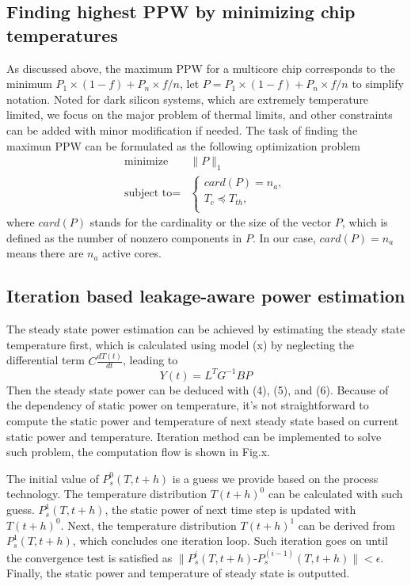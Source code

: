 \subsection{Finding highest PPW by minimizing chip temperatures}
As discussed above, the maximum PPW for a multicore chip corresponds to the minimum $P_{1} \times (1-f)+P_{n} \times f/n$, let $P = P_{1} \times (1-f)+P_{n} \times f/n$ to simplify notation. Noted for dark silicon systems, which are extremely temperature limited, we focus on the major problem of thermal limits, and other constraints can be added with minor modification if needed. The task of finding the maximun PPW can be formulated as the following optimization problem
\begin{equation}
\begin{split}
\text{minimize} & \|P\|_{1}\\
\text{subject to} = &\left\{
\begin{array}{c}
card(P) = n_{a},\\
T_{c} \preceq T_{th},\\
\end{array}
\right.
\end{split}
\end{equation}
where $card(P)$ stands for the cardinality or the size of the vector $P$, which is defined as the number of nonzero components in $P$. In our case, $card(P) = n_{a}$ means there are $n_{a}$ active cores. 

\subsection{Iteration based leakage-aware power estimation}
The steady state power estimation can be achieved by estimating the steady state temperature first, which is calculated using model (x) by neglecting the differential term $C\frac{dT(t)}{dt}$, leading to
\begin{equation}\label{steady_state_temperature}
Y(t) = L^{T}G^{-1}BP
\end{equation}
Then the steady state power can be deduced with (4), (5), and (6).
Because of the dependency of static power on temperature, it's not straightforward to compute the static power and temperature of next steady state based on current static power and temperature. Iteration method can be implemented to solve such problem, the computation flow is shown in Fig.x.

The initial value of $P^0_s(T,t+h)$ is a guess we provide based on the process technology. The temperature distribution $T(t+h)^0$ can be calculated with such guess. $P^1_s(T,t+h)$, the static power of next time step is updated with $T(t+h)^0$. Next, the temperature distribution $T(t+h)^1$ can be derived from $P^1_s(T,t+h)$, which concludes one iteration loop. Such iteration goes on until the convergence test is satisfied as $\parallel P^i_s(T,t+h)$-$P^(i-1)_s(T,t+h)\parallel<\epsilon$. Finally, the static power and temperature of steady state is outputted.

